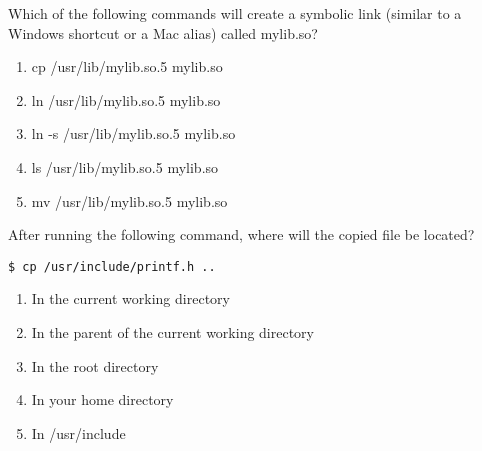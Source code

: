 \documentclass{beamer}
\begin{document}
\begin{frame}[fragile]

Which of the following commands will create a symbolic link (similar to a Windows shortcut or a Mac alias) called mylib.so?

\begin{enumerate}[label=\Alph*)]

\item cp /usr/lib/mylib.so.5 mylib.so

\item ln /usr/lib/mylib.so.5 mylib.so

\item ln -s /usr/lib/mylib.so.5 mylib.so

\item ls /usr/lib/mylib.so.5 mylib.so

\item mv /usr/lib/mylib.so.5 mylib.so

\end{enumerate}

\end{frame}


\begin{frame}[fragile]

After running the following command, where will the copied file be located?

\begin{verbatim}
$ cp /usr/include/printf.h ..
\end{verbatim}

\begin{enumerate}[label=\Alph*)]

\item In the current working directory

\item In the parent of the current working directory

\item In the root directory

\item In your home directory

\item In /usr/include

\end{enumerate}

\end{frame}
\end{document}
